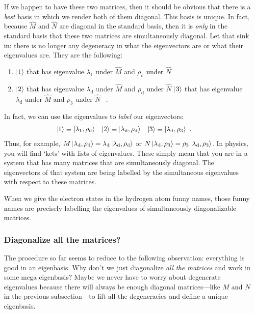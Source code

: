 \documentclass[12pt, oneside]{report}    %
\begin{document}
If we happen to have these two matrices, then it should be obvious that there is a \emph{best} basis in which we render both of them diagonal. This basis is unique. In fact, because $\hat M$ and $\hat N$ are diagonal in the standard basis, then it is \emph{only} in the standard basis that these two matrices are simultaneously diagonal. Let that sink in: there is no longer any degeneracy in what the eigenvectors are or what their eigenvalues are. They are the following:
\begin{enumerate}
    \item $\left|1\right\rangle$ that has eigenvalue $\lambda_1$ under $\hat M$ and $\rho_\text{d}$ under $\hat N$
    \item $\left|2\right\rangle$ that has eigenvalue $\lambda_\text{d}$ under $\hat M$ and $\rho_\text{d}$ under $\hat N$
    $\left|3\right\rangle$ that has eigenvalue $\lambda_\text{d}$ under $\hat M$ and $\rho_\text{3}$ under $\hat N$ \ .
\end{enumerate}
In fact, we can use the eigenvalues to \emph{label} our eigenvectors:
\begin{align}
    \left|1\right\rangle &\equiv \left|\lambda_1,\rho_\textnormal{d}\right\rangle
    &
    \left|2\right\rangle &\equiv \left|\lambda_\textnormal{d},\rho_\textnormal{d}\right\rangle
    &
    \left|3\right\rangle &\equiv \left|\lambda_\textnormal{d},\rho_3\right\rangle \ .
\end{align}
Thus, for example, $M\left|\lambda_\textnormal{d},\rho_\textnormal{d}\right\rangle = \lambda_\textnormal{d}\left|\lambda_\textnormal{d},\rho_\textnormal{d}\right\rangle$ or $N\left|\lambda_\textnormal{d},\rho_3\right\rangle = \rho_3\left|\lambda_\textnormal{d},\rho_3\right\rangle$.
In physics, you will find `kets' with lists of eigenvalues. These simply mean that you are in a system that has many matrices that are simultaneously diagonal. The eigenvectors of that system are being labelled by the simultaneous eigenvalues with respect to these matrices. 

\begin{example}
When we give the electron states in the hydrogen atom funny names, those funny names are precisely labelling the eigenvalues of simultaneously diagonalizable matrices.
\end{example}


\subsubsection*{Diagonalize all the matrices?}

The procedure so far seems to reduce to the following observation: everything is good in an eigenbasis. Why don't we just diagonalize \emph{all the matrices} and work in some mega eigenbasis? Maybe we never have to worry about degenerate eigenvalues because there will always be enough diagonal matrices---like $M$ and $N$ in the previous subsection---to lift all the degeneracies and define a unique eigenbasis.
\end{document}
